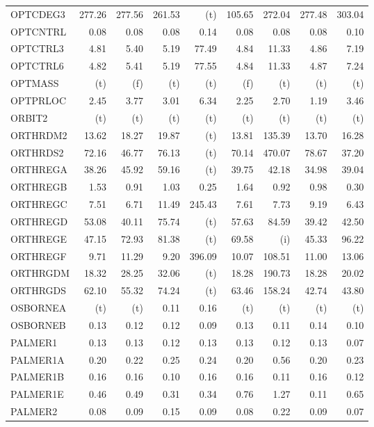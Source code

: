 \documentclass[11pt,twoside]{article}
\begin{document}
{\begin{longtable}[c]{|l|r|r|r|r|r|r|r|r|}
OPTCDEG3 & 277.26 & 277.56 & 261.53 & (t) & 105.65 & 272.04 & 277.48 & 303.04 \\
OPTCNTRL & 0.08 & 0.08 & 0.08 & 0.14 & 0.08 & 0.08 & 0.08 & 0.10 \\
OPTCTRL3 & 4.81 & 5.40 & 5.19 & 77.49 & 4.84 & 11.33 & 4.86 & 7.19 \\
OPTCTRL6 & 4.82 & 5.41 & 5.19 & 77.55 & 4.84 & 11.33 & 4.87 & 7.24 \\
OPTMASS & (t) & (f) & (t) & (t) & (f) & (t) & (t) & (t) \\
OPTPRLOC & 2.45 & 3.77 & 3.01 & 6.34 & 2.25 & 2.70 & 1.19 & 3.46 \\
ORBIT2 & (t) & (t) & (t) & (t) & (t) & (t) & (t) & (t) \\
ORTHRDM2 & 13.62 & 18.27 & 19.87 & (t) & 13.81 & 135.39 & 13.70 & 16.28 \\
ORTHRDS2 & 72.16 & 46.77 & 76.13 & (t) & 70.14 & 470.07 & 78.67 & 37.20 \\
ORTHREGA & 38.26 & 45.92 & 59.16 & (t) & 39.75 & 42.18 & 34.98 & 39.04 \\
ORTHREGB & 1.53 & 0.91 & 1.03 & 0.25 & 1.64 & 0.92 & 0.98 & 0.30 \\
ORTHREGC & 7.51 & 6.71 & 11.49 & 245.43 & 7.61 & 7.73 & 9.19 & 6.43 \\
ORTHREGD & 53.08 & 40.11 & 75.74 & (t) & 57.63 & 84.59 & 39.42 & 42.50 \\
ORTHREGE & 47.15 & 72.93 & 81.38 & (t) & 69.58 & (i) & 45.33 & 96.22 \\
ORTHREGF & 9.71 & 11.29 & 9.20 & 396.09 & 10.07 & 108.51 & 11.00 & 13.06 \\
ORTHRGDM & 18.32 & 28.25 & 32.06 & (t) & 18.28 & 190.73 & 18.28 & 20.02 \\
ORTHRGDS & 62.10 & 55.32 & 74.24 & (t) & 63.46 & 158.24 & 42.74 & 43.80 \\
OSBORNEA & (t) & (t) & 0.11 & 0.16 & (t) & (t) & (t) & (t) \\
OSBORNEB & 0.13 & 0.12 & 0.12 & 0.09 & 0.13 & 0.11 & 0.14 & 0.10 \\
PALMER1 & 0.13 & 0.13 & 0.12 & 0.13 & 0.13 & 0.12 & 0.13 & 0.07 \\
PALMER1A & 0.20 & 0.22 & 0.25 & 0.24 & 0.20 & 0.56 & 0.20 & 0.23 \\
PALMER1B & 0.16 & 0.16 & 0.10 & 0.16 & 0.16 & 0.11 & 0.16 & 0.12 \\
PALMER1E & 0.46 & 0.49 & 0.31 & 0.34 & 0.76 & 1.27 & 0.11 & 0.65 \\
PALMER2 & 0.08 & 0.09 & 0.15 & 0.09 & 0.08 & 0.22 & 0.09 & 0.07 \\

\end{longtable}}
\end{document}
